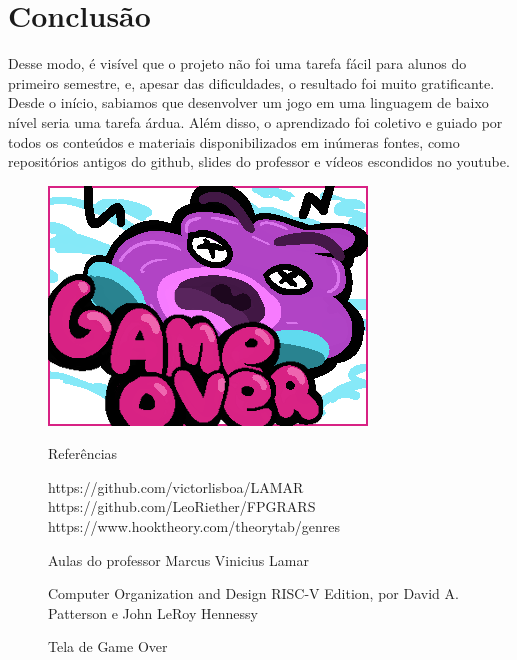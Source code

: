 \documentclass[a4paper]{sbgames}
\begin{document}
\section{Conclusão}
\label{sec:Conclusao}

Desse modo, é visível que o projeto não foi uma tarefa fácil para alunos do primeiro semestre, e, apesar das dificuldades, o resultado foi muito gratificante. Desde o início, sabiamos que desenvolver um jogo em uma linguagem de baixo nível seria uma tarefa árdua. Além disso, o aprendizado foi coletivo e guiado por todos os conteúdos e materiais disponibilizados em inúmeras fontes, como repositórios antigos do github, slides do professor e vídeos escondidos no youtube.

\begin{figure}[H]
  \begin{center}
   \includegraphics[width=1.0\linewidth]{./Figures/GameOver.PNG}
  \end{center}
  \caption{Tela de Game Over}
  \label{fig:05}


\vspace{1.5cm}
\Large Referências
\vspace{1cm}
\large


https://github.com/victorlisboa/LAMAR
https://github.com/LeoRiether/FPGRARS
https://www.hooktheory.com/theorytab/genres

Aulas do professor Marcus Vinicius Lamar

Computer Organization and Design RISC-V Edition, por David A. Patterson e John LeRoy Hennessy




\end{figure}
\end{document}
